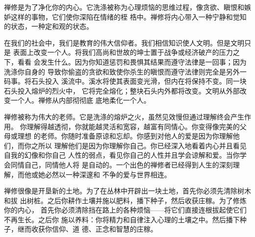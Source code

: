 禅修是为了净化你的内心。它洗涤被称为心理烦恼的思维过程，像贪欲、瞋恨和嫉妒这样的事物，它们使你深陷在情绪的桎
梏中。禅修将内心带入一种宁静和觉知的状态，一种定和观的状态。

在我们的社会中，我们是教育的伟大信仰者。我们相信知识使人文明。但是文明只是
表面上改变一个人。将我们高尚和世故的坤士置于战争或经济破产的压力之下，看看
会发生什么。因为你知道\1惩罚和畏惧其结果而遵守法律是一回事；因为洗涤你自身的
导致你偷盗的贪欲和致使你杀生的瞋恨而遵守法律则完全是另外一码事。将石头投入
溪流中。溪水将使其表面变光滑，但内在将保持不变。同一块石头投入熔炉的烈火中，
它将完全熔化；整块石头内外都将改变。文明从外部改变一个人。禅修从内部彻彻底
底地柔化一个人。

禅修被称为伟大的老师。它是洗涤的熔炉之火，虽然见效慢但通过理解终会产生作用。
你理解得越透彻，你就能越灵活和宽容，越富有同情心。你变得像完美的父母或理想
的老师。你随时准备原谅和忘却。你感到对他人的爱是因为你理解他们，而你之所以
理解他们是因为你理解你自己。你已经深入地看着内心并且看见自我的幻像和你自己
人性的弱点，看见你自己的人性并且学会谅解和爱。当你学会同情自己，同情他人将
是自动的。一个出色的禅修者已经得到人生的深刻理解，而他或她必然以一种深邃和
不争的爱与世界相连。

禅修很像是开垦新的土地。为了在丛林中开辟出一块土地，首先你必须先清除树木和拔
出树桩。之后你耕作土壤并施以肥料，播下种子，然后收获庄稼。为了修炼你的内心，
首先你必须清除挡在路上的各种烦恼——将它们直接连根拔起使它们不再生长。之后你
施以养料：你将精力和自律注入心理的土壤之中。然后播下种子，继而收获你信仰、道
德、正念和智慧的庄稼。

\endchapter

\vfill\eject\byebye
